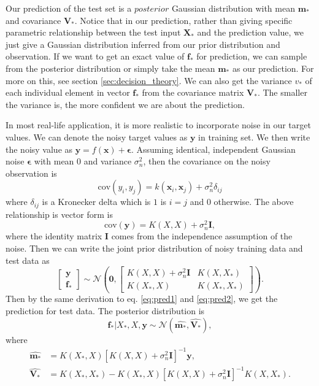 \documentclass[11pt,a4paper]{article}
\theoremstyle{definition}
\numberwithin{equation}{section}
\let\vec\mathbf
\begin{document}
	Our prediction of the test set is a $posterior$ Gaussian distribution with mean $\vec m_*$ and covariance $\vec V_*$.  Notice that in our prediction, rather than giving specific parametric relationship between the test input $\vec X_*$ and the prediction value, we just give a Gaussian distribution inferred from our prior distribution and observation. If we want to get an exact value of $\vec f_*$ for prediction, we can sample from the posterior distribution or simply take the mean $\vec m_*$ as our prediction. For more on this, see section \ref{sec:decision_theory}. We can also get the variance $v_*$ of each individual element in vector  $\vec f_*$ from the covariance matrix $\vec V_*$. The smaller the variance is, the more confident we are about the prediction. 
	
	In most real-life application, it is more realistic to incorporate noise in our target values. We can denote the noisy target values as $\vec y$ in training set. We then write the noisy value as $\vec y = f(\vec x) + \vec\epsilon$. Assuming identical, independent Gaussian noise $\vec \epsilon$ with mean $0$ and variance $\sigma^2_n$, then the covariance on the noisy observation is
	\begin{equation*} \label{}
	\mathrm{cov} (y_i,y_j) = k(\vec x_i,\vec x_j) + \sigma^2_n \delta_{ij}
	\end{equation*}
	where $\delta_{ij}$ is a Kronecker delta which is $1$ is $i=j$ and $0$ otherwise. The above relationship is vector form is
	\begin{equation} \label{cov_y}
	\mathrm{cov} (\vec y) = K(X,X) + \sigma^2_n \vec I,
	\end{equation}
	where the identity matrix $\vec I$ comes from the independence assumption of the noise. Then we can write the joint prior distribution of noisy training data and test data as
	\begin{equation} \label{}
	\begin{bmatrix}
	\vec y\\
	\vec f_*
	\end{bmatrix}
	\sim
	\mathcal{N}\left(\vec 0, 
	\begin{bmatrix}
	K(X,X)+ \sigma^2_n \vec I & K(X,X_*)\\
	K(X_*,X) & K(X_*,X_*)
	\end{bmatrix}
	\right).
	\end{equation}
	Then by the same derivation to eq. \ref{eq:pred1} and \ref{eq:pred2}, we get the prediction for test data. The posterior distribution is 
	\begin{equation} \label{eq:pred3}
	\vec f_* | X_*, X, \vec y \sim \mathcal N (\widehat{\vec m_*}, \widehat{\vec V_*}),
	\end{equation}
	where
	\begin{equation} \label{eq:pred4}
	\begin{split}
	\widehat{\vec m_* }&= K(X_*,X)[K(X,X)+ \sigma^2_n \vec I]^{-1}\vec y,\\
	\widehat{\vec V_*} &= K(X_*,X_*) - K(X_*,X)[K(X,X)+ \sigma^2_n \vec I]^{-1}K(X,X_*).
	\end{split}
	\end{equation}
	
\end{document}
